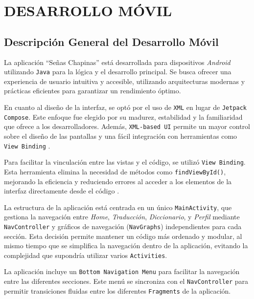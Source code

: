 
\section{DESARROLLO MÓVIL}

\subsection{Descripción General del Desarrollo Móvil}

La aplicación ``Señas Chapinas'' está desarrollada para dispositivos \textit{Android} utilizando \texttt{Java} para la lógica y el desarrollo principal. Se busca ofrecer una experiencia de usuario intuitiva y accesible, utilizando arquitecturas modernas y prácticas eficientes para garantizar un rendimiento óptimo.

En cuanto al diseño de la interfaz, se optó por el uso de \texttt{XML} en lugar de \texttt{Jetpack Compose}. Este enfoque fue elegido por su madurez, estabilidad y la familiaridad que ofrece a los desarrolladores. Además, \texttt{XML-based UI} permite un mayor control sobre el diseño de las pantallas y una fácil integración con herramientas como \texttt{View Binding} \cite{DeLaGrana2024}.

Para facilitar la vinculación entre las vistas y el código, se utilizó \texttt{View Binding}. Esta herramienta elimina la necesidad de métodos como \texttt{findViewById()}, mejorando la eficiencia y reduciendo errores al acceder a los elementos de la interfaz directamente desde el código \cite{Ozaltun2022}.

La estructura de la aplicación está centrada en un único \texttt{MainActivity}, que gestiona la navegación entre \textit{Home}, \textit{Traducción}, \textit{Diccionario}, y \textit{Perfil} mediante \texttt{NavController} y gráficos de navegación (\texttt{NavGraphs}) independientes para cada sección. Esta decisión permite mantener un código más ordenado y modular, al mismo tiempo que se simplifica la navegación dentro de la aplicación, evitando la complejidad que supondría utilizar varios \texttt{Activities}.

La aplicación incluye un \texttt{Bottom Navigation Menu} para facilitar la navegación entre las diferentes secciones. Este menú se sincroniza con el \texttt{NavController} para permitir transiciones fluidas entre los diferentes \texttt{Fragments} de la aplicación.

